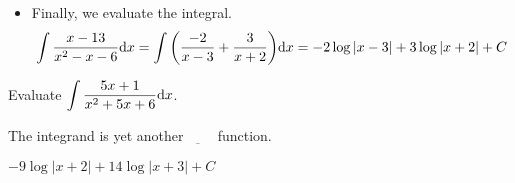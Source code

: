 \begin{solution}
\begin{itemize}
\item
Finally, we evaluate the integral.
\begin{align*}
\int \frac{x-13}{x^2-x-6}\mathrm{d}x
=\int\bigg(\frac{-2}{x-3} + \frac{3}{x+2}\bigg)\mathrm{d}x
=-2\log|x-3|+3\log|x+2|+C
\end{align*}

\end{itemize}


\end{solution}

\begin{question}[2014D]
Evaluate $\displaystyle\int \frac{5x+1}{x^2+5x+6}\mathrm{d}x$.
\end{question}

\begin{hint}
The integrand is yet another $\underbar{\ \ \ \ \ \ \ \ }$ function.
\end{hint}

\begin{answer}
$ -9\log|x+2|+14\log|x+3| +C$
\end{answer}

